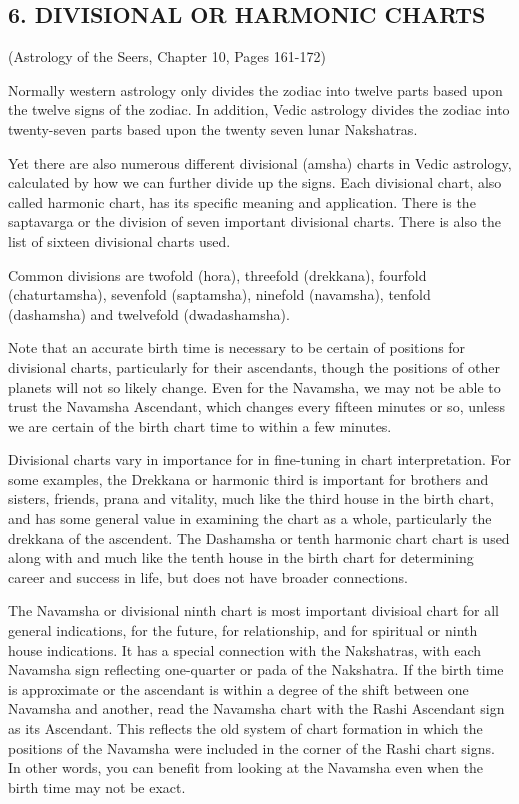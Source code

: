 \subsection{6. DIVISIONAL OR HARMONIC CHARTS} (Astrology of the Seers, Chapter 10, Pages 161-172)
 

Normally western astrology only divides the zodiac into twelve parts based upon the twelve signs of the zodiac. In addition, Vedic astrology divides the zodiac into twenty-seven parts based upon the twenty seven lunar Nakshatras.

Yet there are also numerous different divisional (amsha) charts in Vedic astrology, calculated by how we can further divide up the signs. Each divisional chart, also called harmonic chart, has its specific meaning and application. There is the saptavarga or the division of seven important divisional charts.  There is also the list of sixteen divisional charts used.

Common divisions are twofold (hora), threefold (drekkana), fourfold (chaturtamsha), sevenfold (saptamsha), ninefold (navamsha), tenfold (dashamsha) and twelvefold (dwadashamsha).

 

Note that an accurate birth time is necessary to be certain of positions for divisional charts, particularly for their ascendants, though the positions of other planets will not so likely change. Even for the Navamsha, we may not be able to trust the Navamsha Ascendant, which changes every fifteen minutes or so, unless we are certain of the birth chart time to within a few minutes. 

 

Divisional charts vary in importance for in fine-tuning in chart interpretation. For some examples, the Drekkana or harmonic third is important for brothers and sisters, friends, prana and vitality, much like the third house in the birth chart, and has some general value in examining the chart as a whole, particularly the drekkana of the ascendent. The Dashamsha or tenth harmonic chart chart is used along with and much like the tenth house in the birth chart for determining career and success in life, but does not have broader connections.

The Navamsha or divisional ninth chart is most important divisioal chart for all general indications, for the future, for relationship, and for spiritual or ninth house indications. It has a special connection with the Nakshatras, with each Navamsha sign reflecting one-quarter or pada of the Nakshatra.
If the birth time is approximate or the ascendant is within a degree of the shift between one Navamsha and another, read the Navamsha chart with the Rashi Ascendant sign as its Ascendant. This reflects the old system of chart formation in which the positions of the Navamsha were included in the corner of the Rashi chart signs. In other words, you can benefit from looking at the Navamsha even when the birth time may not be exact.
 

